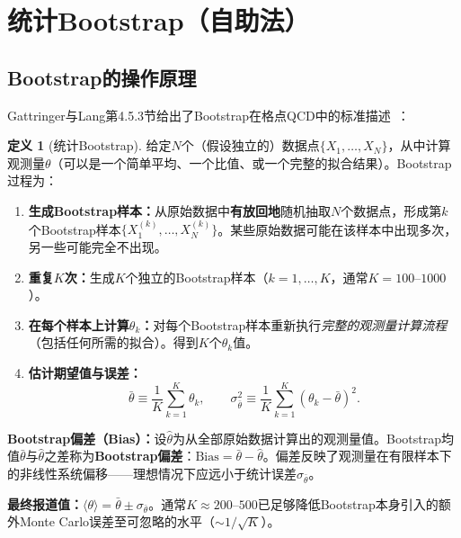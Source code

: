 \documentclass[12pt,a4paper]{ctexart}
\theoremstyle{definition}
\newtheorem{definition}{定义}[section]
\begin{document}
\section{统计Bootstrap（自助法）}

\subsection{Bootstrap的操作原理}

Gattringer与Lang第4.5.3节给出了Bootstrap在格点QCD中的标准描述~\cite{GattringerLang2010}：

\begin{definition}[统计Bootstrap]
给定$N$个（假设独立的）数据点$\{X_1, \dots, X_N\}$，从中计算观测量$\theta$（可以是一个简单平均、一个比值、或一个完整的拟合结果）。Bootstrap过程为：
\begin{enumerate}[nosep]
    \item \textbf{生成Bootstrap样本：}从原始数据中\textbf{有放回地}随机抽取$N$个数据点，形成第$k$个Bootstrap样本$\{X_1^{(k)}, \dots, X_N^{(k)}\}$。某些原始数据可能在该样本中出现多次，另一些可能完全不出现。
    \item \textbf{重复$K$次：}生成$K$个独立的Bootstrap样本（$k = 1, \dots, K$，通常$K = 100\text{--}1000$）。
    \item \textbf{在每个样本上计算$\theta_k$：}对每个Bootstrap样本重新执行\emph{完整的观测量计算流程}（包括任何所需的拟合）。得到$K$个$\theta_k$值。
    \item \textbf{估计期望值与误差：}
    \begin{equation}
    \bar\theta \equiv \frac{1}{K}\sum_{k=1}^K \theta_k, \qquad
    \sigma_{\bar\theta}^2 \equiv \frac{1}{K}\sum_{k=1}^K (\theta_k - \bar\theta)^2.
    \label{eq:bootstrap_estimators}
    \end{equation}
\end{enumerate}
\end{definition}

\textbf{Bootstrap偏差（Bias）：}设$\hat\theta$为从全部原始数据计算出的观测量值。Bootstrap均值$\bar\theta$与$\hat\theta$之差称为\textbf{Bootstrap偏差}：$\text{Bias} = \bar\theta - \hat\theta$。偏差反映了观测量在有限样本下的非线性系统偏移——理想情况下应远小于统计误差$\sigma_{\bar\theta}$。

\textbf{最终报道值：}$\langle \theta \rangle = \bar\theta \pm \sigma_{\bar\theta}$。通常$K \approx 200\text{--}500$已足够降低Bootstrap本身引入的额外Monte Carlo误差至可忽略的水平（$\sim 1/\sqrt{K}$）。
\end{document}
